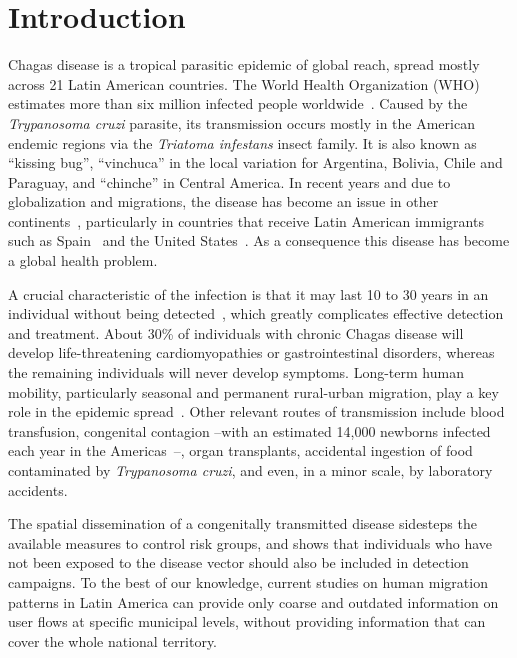 
\chapter{Introduction}\label{ch:introduction}


Chagas disease is a tropical parasitic epidemic of global reach, spread mostly across 21 Latin American countries. The World Health Organization (WHO) estimates more than six million infected people worldwide~\cite{who2016}. Caused by the \textit{Trypanosoma cruzi} parasite, its transmission occurs mostly in the American endemic regions via the \textit{Triatoma infestans} insect family. It is also known as ``kissing bug'', ``vinchuca'' in the local variation for Argentina, Bolivia, Chile and Paraguay, and ``chinche'' in Central America. 
In recent years and due to globalization and migrations, the disease has become an %
issue in other continents~\cite{schmunis2010chagas},
particularly in countries that receive Latin American immigrants such as Spain~\cite{navarro2012chagas} and the United States~\cite{hotez2013unfolding}.
As a consequence this disease has become a global health problem.


A crucial characteristic of the infection is that it may last 10 to 30 years in an individual without being detected~\cite{rassi2012american}, which greatly complicates effective detection and treatment. 
About 30\% of individuals with chronic Chagas disease will develop life-threatening cardiomyopathies or gastrointestinal disorders, whereas
the remaining individuals will never develop symptoms. 
Long-term human mobility, particularly seasonal and permanent rural-urban migration, play a key role in the epidemic spread~\cite{briceno2009chagas}. 
Other relevant routes of transmission include blood transfusion, congenital contagion --with an estimated 14,000 newborns infected each year in the Americas~\cite{OPS2006chagas}--, organ transplants, accidental ingestion of food contaminated by \textit{Trypanosoma cruzi}, and even, in a minor scale,
by laboratory accidents.

The spatial dissemination of a congenitally transmitted disease sidesteps the available measures to control risk groups, and shows that individuals who have not been exposed to the disease vector should also be included in detection campaigns.
To the best of our knowledge, current studies on human migration patterns in Latin America can provide only coarse and outdated information on user flows at specific municipal levels, without providing information that can cover the whole national territory.

